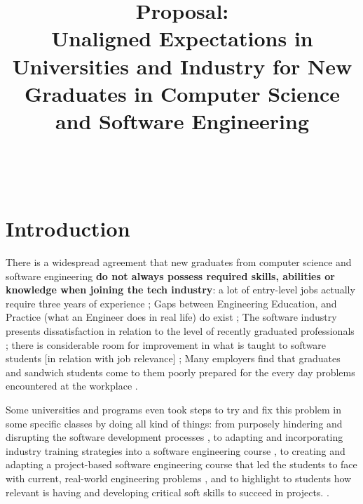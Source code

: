 \documentclass{sigchi}
\begin{document}
\title{Proposal:\\ Unaligned Expectations in Universities and Industry for New Graduates in Computer Science and Software Engineering}

\author{%
  \\
  \\
}

\maketitle

\section{Introduction}
There is a widespread agreement that new graduates from computer science and software engineering \textbf{do not always possess required skills, abilities or knowledge when joining the tech industry}: a lot of entry-level jobs actually require three years of experience \cite{Chakrabarti2018}; Gaps between Engineering Education, and Practice (what an Engineer does in real life) do exist \cite{Sivanesan2017}; The software industry presents dissatisfaction in relation to the level of recently graduated professionals \cite{Portela2017}; there is considerable room for improvement in what is taught to software students [in relation with job relevance] \cite{Lethbridgea}; Many employers find that graduates and sandwich students come to them poorly prepared for the every day problems encountered at the workplace \cite{Dawson2000}.\newline

Some universities and programs even took steps to try and fix this problem in some specific classes by doing all kind of things: from purposely hindering and disrupting the software development processes \cite{Dawson2000}, to adapting and incorporating industry training strategies into a software engineering course \cite{Portela2017}, to creating and adapting a project-based software engineering course that led the students to face with current, real-world engineering problems \cite{Delgado2017}, and to highlight to students how relevant is having and developing critical soft skills to succeed in projects. \cite{Bastarrica2017}.\newline
\end{document}
